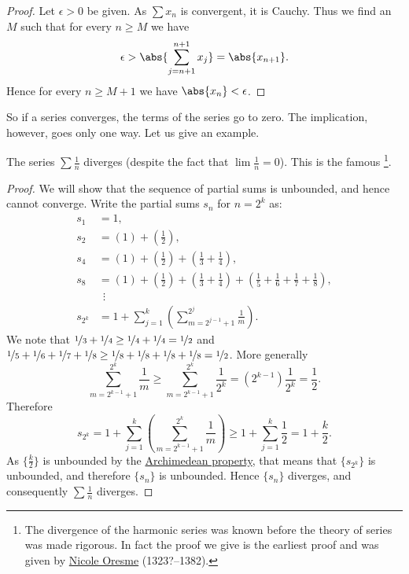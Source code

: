 \documentclass[12pt]{book}
\begin{document}
\begin{proof}
Let $\epsilon > 0$ be given.
As $\sum x_n$ is convergent, it is Cauchy.
Thus we find an $M$ such that for every $n \geq M$ we have
\begin{equation*}
\epsilon > 
\abs{ \sum_{j={n+1}}^{n+1} x_j }
=
\abs{ x_{n+1} } .
\end{equation*}
Hence for every $n \geq M+1$ we have $\abs{x_{n}} < \epsilon$.
\end{proof}

So if a series converges, the terms of the series go to zero.
The implication, however, goes only one way.
Let us give an example.

\begin{example} \label{example:harmonicseries}
The series $\sum \frac{1}{n}$ diverges (despite the fact that $\lim
\frac{1}{n} = 0$).
This is the famous \emph{}%
\footnote{The divergence of the harmonic series was known 
before the theory of series was made rigorous.
In fact the proof we
give is the earliest proof and was given by
\href{http://en.wikipedia.org/wiki/Oresme}{Nicole Oresme}
(1323?--1382).}.

\begin{proof} We will show that the sequence of partial sums is unbounded, and hence
cannot converge.
Write the partial sums $s_n$ for $n = 2^k$ as:
\begin{align*}
 s_1 & = 1 , \\
 s_2 & = \left( 1 \right) + \left( \frac{1}{2} \right) , \\
 s_4 & = \left( 1 \right) + \left( \frac{1}{2} \right) +
        \left( \frac{1}{3} + \frac{1}{4} \right) , \\
 s_8 & = \left( 1 \right) + \left( \frac{1}{2} \right) +
        \left( \frac{1}{3} + \frac{1}{4} \right) +
        \left( \frac{1}{5} + \frac{1}{6} + \frac{1}{7} + \frac{1}{8} \right) , \\
& ~~ \vdots \\
 s_{2^k} & = 
1 + 
\sum_{j=1}^k
\left(
\sum_{m=2^{j-1}+1}^{2^j} \frac{1}{m}
\right) .
\end{align*}
We note that $\nicefrac{1}{3} + \nicefrac{1}{4} \geq \nicefrac{1}{4} + \nicefrac{1}{4} =
\nicefrac{1}{2}$ and
$\nicefrac{1}{5} + \nicefrac{1}{6} + \nicefrac{1}{7} + \nicefrac{1}{8}
\geq \nicefrac{1}{8} + \nicefrac{1}{8} + \nicefrac{1}{8} + \nicefrac{1}{8} =
\nicefrac{1}{2}$.
More generally
\begin{equation*}
\sum_{m=2^{k-1}+1}^{2^k} \frac{1}{m}
\geq
\sum_{m=2^{k-1}+1}^{2^k} \frac{1}{2^k}
=
(2^{k-1}) \frac{1}{2^k} = \frac{1}{2} .
\end{equation*}
Therefore
\begin{equation*}
s_{2^k} = 
1 + 
\sum_{j=1}^k
\left(
\sum_{m=2^{k-1}+1}^{2^k} \frac{1}{m}
\right) 
\geq
1 + \sum_{j=1}^k \frac{1}{2} = 1 + \frac{k}{2} .
\end{equation*}
As $\{ \frac{k}{2} \}$ is unbounded by the
\hyperref[thm:arch:i]{Archimedean property}, that means that
$\{ s_{2^k} \}$ is unbounded, and therefore $\{ s_n \}$ is unbounded.
Hence $\{ s_n \}$ diverges, and consequently $\sum \frac{1}{n}$ diverges.
\end{proof}
\end{example}
\end{document}
